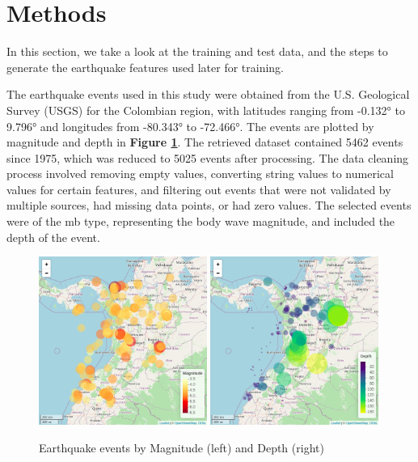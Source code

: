 \documentclass[sn-mathphys-num]{sn-jnl}
\begin{document}
\section{Methods}\label{methods}

In this section, we take a look at the training and test data, and the steps to generate the earthquake features used later for training.

The earthquake events used in this study were obtained from the U.S. Geological Survey (USGS) for the Colombian region, with latitudes ranging from -0.132° to 9.796° and longitudes from -80.343° to -72.466°. The events are plotted by magnitude and depth in \textbf{Figure \ref{fig1}}. The retrieved dataset contained 5462 events since 1975, which was reduced to 5025 events after processing. The data cleaning process involved removing empty values, converting string values to numerical values for certain features, and filtering out events that were not validated by multiple sources, had missing data points, or had zero values. The selected events were of the mb type, representing the body wave magnitude, and included the depth of the event.

\begin{figure}[H]
    \includegraphics[width=0.49\textwidth]{img/mag01.png}
    \includegraphics[width=0.49\textwidth]{img/depth01.png}
    \caption{Earthquake events by Magnitude (left) and Depth (right)}\label{fig1}
\end{figure}
\end{document}
